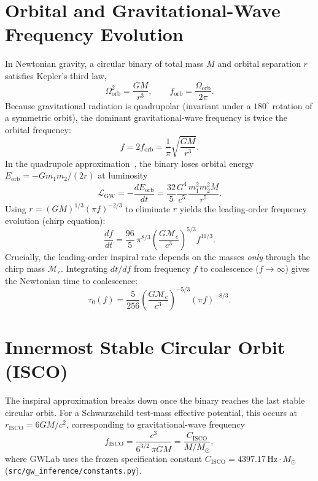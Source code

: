 \documentclass[11pt,a4paper]{report}
\begin{document}
\section{Orbital and Gravitational-Wave Frequency Evolution}
In Newtonian gravity, a circular binary of total mass $M$ and orbital separation $r$ satisfies Kepler's third law,
\begin{equation}
\Omega_{\mathrm{orb}}^2 = \frac{G M}{r^3}, \qquad f_{\mathrm{orb}} = \frac{\Omega_{\mathrm{orb}}}{2\pi}.
\end{equation}
Because gravitational radiation is quadrupolar (invariant under a $180^\circ$ rotation of a symmetric orbit), the dominant gravitational-wave frequency is twice the orbital frequency:
\begin{equation}
f = 2 f_{\mathrm{orb}} = \frac{1}{\pi}\sqrt{\frac{G M}{r^3}}.
\end{equation}
In the quadrupole approximation~\cite{Finn1992,CutlerFlanagan1994}, the binary loses orbital energy $E_{\mathrm{orb}} = -G m_1 m_2 / (2r)$ at luminosity
\begin{equation}
\mathcal{L}_{\mathrm{GW}} = -\frac{dE_{\mathrm{orb}}}{dt} = \frac{32}{5}\frac{G^4}{c^5}\frac{m_1^2 m_2^2 M}{r^5}.
\end{equation}
Using $r = (G M)^{1/3} (\pi f)^{-2/3}$ to eliminate $r$ yields the leading-order frequency evolution (chirp equation):
\begin{equation}
\frac{df}{dt} = \frac{96}{5}\,\pi^{8/3}\left(\frac{G \mathcal{M}_c}{c^3}\right)^{5/3} f^{11/3}.
\end{equation}
Crucially, the leading-order inspiral rate depends on the masses \emph{only} through the chirp mass $\mathcal{M}_c$. Integrating $dt/df$ from frequency $f$ to coalescence ($f \to \infty$) gives the Newtonian time to coalescence:
\begin{equation}
\tau_0(f) = \frac{5}{256}\left(\frac{G \mathcal{M}_c}{c^3}\right)^{-5/3} (\pi f)^{-8/3}.
\end{equation}

\section{Innermost Stable Circular Orbit (ISCO)}
The inspiral approximation breaks down once the binary reaches the last stable circular orbit. For a Schwarzschild test-mass effective potential, this occurs at $r_{\mathrm{ISCO}} = 6 G M / c^2$, corresponding to gravitational-wave frequency
\begin{equation}
f_{\mathrm{ISCO}} = \frac{c^3}{6^{3/2}\,\pi G M} = \frac{C_{\mathrm{ISCO}}}{M / M_\odot},
\end{equation}
where GWLab uses the frozen specification constant $C_{\mathrm{ISCO}} = 4397.17\,\mathrm{Hz}\cdot M_\odot$ (\texttt{src/gw\_inference/constants.py}).
\end{document}
